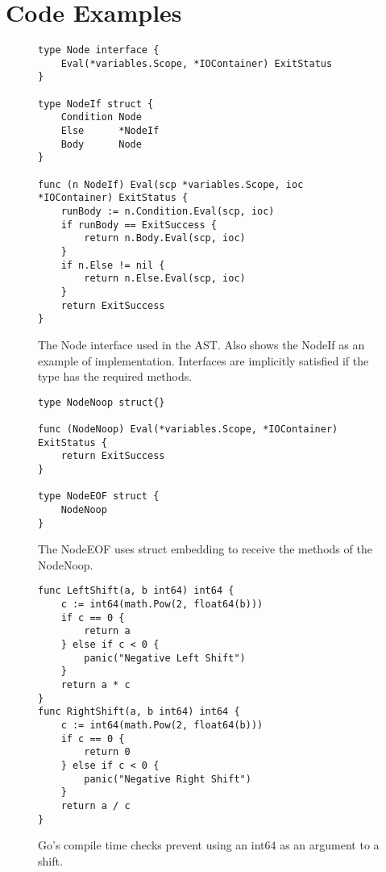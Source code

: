\chapter{Code Examples}

\begin{figure}[hp]
\begin{lstlisting}[frame=tb,language=Golang]
type Node interface {
	Eval(*variables.Scope, *IOContainer) ExitStatus
}

type NodeIf struct {
	Condition Node
	Else      *NodeIf
	Body      Node
}

func (n NodeIf) Eval(scp *variables.Scope, ioc *IOContainer) ExitStatus {
	runBody := n.Condition.Eval(scp, ioc)
	if runBody == ExitSuccess {
		return n.Body.Eval(scp, ioc)
	}
	if n.Else != nil {
		return n.Else.Eval(scp, ioc)
	}
	return ExitSuccess
}     
\end{lstlisting}
\caption[The Node Interface]{The Node interface used in the AST. Also shows the NodeIf as an example of implementation. Interfaces are implicitly satisfied if the type has the required methods. \label{lst:node-interface}}
\end{figure}

\begin{figure}[hp]
\begin{lstlisting}[frame=tb,language=Golang]
type NodeNoop struct{}

func (NodeNoop) Eval(*variables.Scope, *IOContainer) ExitStatus {
	return ExitSuccess 
}

type NodeEOF struct {
	NodeNoop
}
\end{lstlisting}
\caption[The EOF and No Op node]{The NodeEOF uses struct embedding to receive the methods of the NodeNoop.\label{lst:node-noop}}
\end{figure}


\begin{figure}[hp]
\begin{lstlisting}[frame=tb,language=Golang]
func LeftShift(a, b int64) int64 {
	c := int64(math.Pow(2, float64(b)))
	if c == 0 {
		return a
	} else if c < 0 {
		panic("Negative Left Shift")
	}
	return a * c
}
func RightShift(a, b int64) int64 {
	c := int64(math.Pow(2, float64(b)))
	if c == 0 {
		return 0
	} else if c < 0 {
		panic("Negative Right Shift")
	}
	return a / c
}
\end{lstlisting}
\caption[Shift helper functions]{Go's compile time checks prevent using an int64 as an argument to a shift.\label{lst:arith-shift}}
\end{figure}

